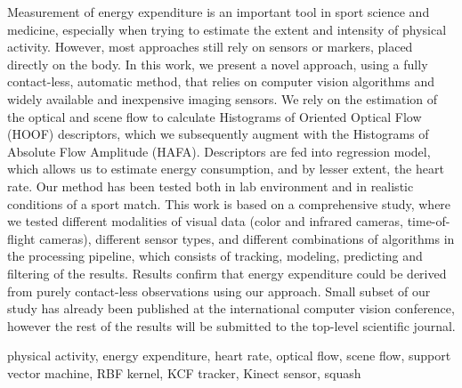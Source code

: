 \abstractp
Measurement of energy expenditure is an important tool in sport science and medicine, especially when trying to estimate the extent and intensity of physical activity. However, most approaches still rely on sensors or markers, placed directly on the body. In this work, we present a novel approach, using a fully contact-less, automatic method, that relies on computer vision algorithms and widely available and inexpensive imaging sensors. We rely on the estimation of the optical and scene flow to calculate Histograms of Oriented Optical Flow (HOOF) descriptors, which we subsequently augment with the Histograms of Absolute Flow Amplitude (HAFA). Descriptors are fed into regression model, which allows us to estimate energy consumption, and by lesser extent, the heart rate. Our method has been tested both in lab environment and in realistic conditions of a sport match. This work is based on a comprehensive study, where we tested different modalities of visual data (color and infrared cameras, time-of-flight cameras), different sensor types, and different combinations of algorithms in the processing pipeline, which consists of tracking, modeling, predicting and filtering of the results. Results confirm that energy expenditure could be derived from purely contact-less observations using our approach. Small subset of our study has already been published at the international computer vision conference, however the rest of the results will be submitted to the top-level scientific journal.

\keywords physical activity, energy expenditure, heart rate, optical flow, scene flow, support vector machine, RBF kernel, KCF tracker, Kinect sensor, squash